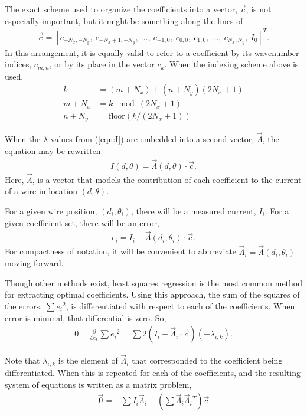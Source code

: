 \documentclass{article}
\begin{document}
The exact scheme used to organize the coefficients into a vector, $\vec{c}$, is not especially important, but it might be something along the lines of 
\begin{align}
\vec{c} = [c_{-N_x,-N_y},\ c_{-N_x+1, -N_y},\ \ldots,\ c_{-1,0},\ c_{0,0},\ c_{1,0},\ \ldots,\ c_{N_x,N_y},\ I_0]^T.
\end{align}
In this arrangement, it is equally valid to refer to a coefficient by its wavenumber indices, $c_{m,n}$, or by its place in the vector $c_k$.  When the indexing scheme above is used,
\begin{align}
k &= (m + N_x) + (n+N_y) (2N_x+1)\\
m + N_x &= k \mod{(2N_x+1)}\\
n + N_y &= \mathrm{floor}(k / (2N_x+1))
\end{align}

When the $\lambda$ values from (\ref{eqn:I}) are embedded into a second vector, $\vec{\Lambda}$, the equation may be rewritten
\begin{align}
I(d,\theta) = \vec{\Lambda}(d,\theta) \cdot \vec{c}.
\end{align}
Here, $\vec{\Lambda}$, is a vector that models the contribution of each coefficient to the current of a wire in location $(d,\theta)$.

For a given wire position, $(d_i, \theta_i)$, there will be a measured current, $I_i$.  For a given coefficient set, there will be an error,
\begin{align}
e_i = I_i - \vec{\Lambda}(d_i, \theta_i) \cdot \vec{c}.
\end{align}
For compactness of notation, it will be convenient to abbreviate $\vec{\Lambda}_i = \vec{\Lambda}(d_i, \theta_i)$ moving forward.  

Though other methods exist, least squares regression is the most common method for extracting optimal coefficients.  Using this approach, the sum of the squares of the errors, $\sum e_i{^2}$, is differentiated with respect to each of the coefficients.  When error is minimal, that differential is zero.  So,
\begin{align}
0 = \frac{\partial}{\partial c_k} \sum e_i {^2} = \sum 2\left(I_i - \vec{\Lambda}_i \cdot \vec{c}\right)\left(- \lambda_{i,k}\right).
\end{align}

Note that $\lambda_{i,k}$ is the element of $\vec{\Lambda}_i$ that corresponded to the coefficient being differentiated.  When this is repeated for each of the coefficients, and the resulting system of equations is written as a matrix problem,
\begin{align}
\vec{0} = -\sum I_i \vec{\Lambda}_i + \left(\sum \vec{\Lambda}_i \vec{\Lambda}_i{^T} \right) \vec{c}
\end{align}
\end{document}
